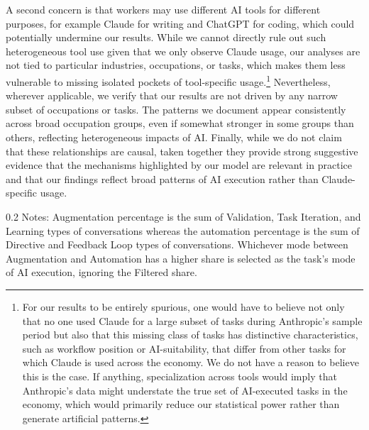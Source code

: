 A second concern is that workers may use different AI tools for different purposes, for example Claude for writing and ChatGPT for coding, which could potentially undermine our results.
While we cannot directly rule out such heterogeneous tool use given that we only observe Claude usage, our analyses are not tied to particular industries, occupations, or tasks, which makes them less vulnerable to missing isolated pockets of tool-specific usage.\footnote{
For our results to be entirely spurious, one would have to believe not only that no one used Claude for a large subset of tasks during Anthropic's sample period but also that this missing class of tasks has distinctive characteristics, such as workflow position or AI-suitability, that differ from other tasks for which Claude is used across the economy.
We do not have a reason to believe this is the case.
If anything, specialization across tools would imply that Anthropic's data might understate the true set of AI-executed tasks in the economy, which would primarily reduce our statistical power rather than generate artificial patterns.
}
Nevertheless, wherever applicable, we verify that our results are not driven by any narrow subset of occupations or tasks.
The patterns we document appear consistently across broad occupation groups, even if somewhat stronger in some groups than others, reflecting heterogeneous impacts of AI.
Finally, while we do not claim that these relationships are causal, taken together they provide strong suggestive evidence that the mechanisms highlighted by our model are relevant in practice and that our findings reflect broad patterns of AI execution rather than Claude-specific usage.


\begin{landscape}
\begin{table}[!t]
    \caption{Example O*NET Tasks Associated with Claude Conversations, and Calculated Augmentation vs.\ Automation Outcomes}
    \label{tab:example_anthropic_AI_tasks}
    \footnotesize
    \centering
    
    \begin{minipage}{1\linewidth}
\begin{spacing}{0.2}
{\fontsize{9.5pt}{10pt}\selectfont Notes: Augmentation percentage is the sum of Validation, Task Iteration, and Learning types of conversations whereas the automation percentage is the sum of Directive and Feedback Loop types of conversations.
Whichever mode between Augmentation and Automation has a higher share is selected as the task's mode of AI execution, ignoring the Filtered share.}
\end{spacing}
\end{minipage}
\end{table}
\end{landscape}
